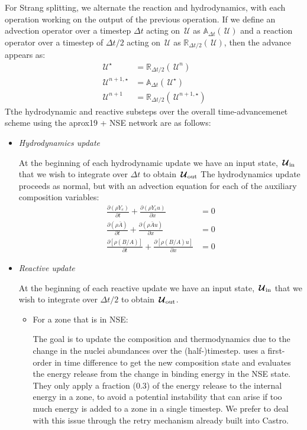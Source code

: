\documentclass[times,modern]{aastex63}
\newcommand{\castro}{{\sf Castro}}
\newcommand{\ddx}[1]{{\frac{{\partial#1}}{\partial x}}}
\newcommand{\ddt}[1]{{\frac{{\partial#1}}{\partial t}}}
\newcommand{\Uc}{{\,\bm{\mathcal{U}}}}
\begin{document}
For Strang splitting, we alternate the reaction and hydrodynamics,
with each operation working on the output of the previous operation.
If we define an advection operator over a timestep $\Delta t$ acting on $\Uc$ as
$\mathbb{A}_{\Delta t}(\Uc)$ and a reaction operator over a timestep of
$\Delta t/2$ acting on $\Uc$ as $\mathbb{R}_{\Delta t/2}(\Uc)$, then the advance appears
as:
\begin{align}
  \Uc^\star &= \mathbb{R}_{\Delta t/2}(\Uc^n) \\
  \Uc^{n+1,\star} &= \mathbb{A}_{\Delta t}(\Uc^\star) \\
  \Uc^{n+1} &= \mathbb{R}_{\Delta t/2}(\Uc^{n+1,\star})
\end{align}
Tthe hydrodynamic and reactive substeps over
the overall time-advancemenet scheme using the aprox19 + NSE network
are as follows:
\begin{itemize}

\item {\em Hydrodynamics update}
  
  At the beginning of each hydrodynamic update we have an input state,
  $\Uc_{\rm in}$ that we wish to integrate over $\Delta t$ to obtain $\Uc_{\rm out}$
  The hydrodynamics update proceeds as normal, but with an advection
  equation for each of the auxiliary composition variables:
  \begin{align}
    \ddt{(\rho Y_e)} + \ddx{(\rho Y_e u)} &= 0 \\
    \ddt{(\rho \bar{A})} + \ddx{(\rho \bar{A} u)} &= 0 \\
    \ddt{[\rho (B/A)]} + \ddx{[\rho (B/A) u]} &= 0 
  \end{align}


\item {\em Reactive update}

  At the beginning of each reactive update we have an input state,
  $\Uc_{\rm in}$ that we wish to integrate over $\Delta t/2$ to obtain $\Uc_{\rm out}$.
  
  \begin{itemize}

    \item For a zone that is in NSE:

      The goal is to update the composition and thermodynamics due to the 
      change in the nuclei abundances over the (half-)timestep.  \citet{ma:2013}
      uses a first-order in time difference to get the new composition state
      and evaluates the energy release from the change in binding energy in the NSE
      state.  They only apply a fraction (0.3) of the energy release to the internal
      energy in a zone, to avoid a potential instability that can arise if too much
      energy is added to a zone in a single timestep.  We prefer to deal with this
      issue through the retry mechanism already built into \castro.


\end{itemize}
\end{itemize}
\end{document}
